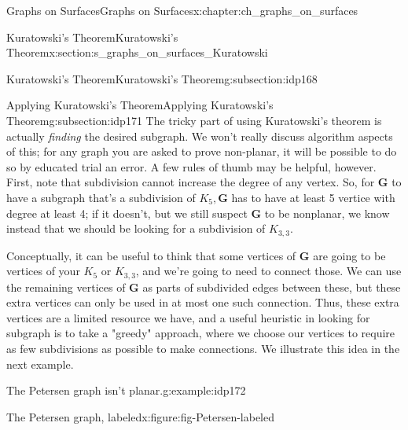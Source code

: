 \documentclass[oneside,10pt,]{book}
\numberwithin{equation}{section}
\newcommand{\bfG}{\mathbf{G}}
\begin{document}
\begin{chapterptx}{Graphs on Surfaces}{}{Graphs on Surfaces}{}{}{x:chapter:ch_graphs_on_surfaces}
\begin{sectionptx}{Kuratowski's Theorem}{}{Kuratowski's Theorem}{}{}{x:section:s_graphs_on_surfaces_Kuratowski}
\begin{subsectionptx}{Kuratowski's Theorem}{}{Kuratowski's Theorem}{}{}{g:subsection:idp168}
\end{subsectionptx}
%
%
\typeout{************************************************}
\typeout{************************************************}
%
\begin{subsectionptx}{Applying Kuratowski's Theorem}{}{Applying Kuratowski's Theorem}{}{}{g:subsection:idp171}
The tricky part of using Kuratowski's theorem is actually \emph{finding} the desired subgraph.  We won't really discuss algorithm aspects of this; for any graph you are asked to prove non-planar, it will be possible to do so by educated trial an error.  A few rules of thumb may be helpful, however.  First, note that subdivision cannot increase the degree of any vertex.  So, for \(\bfG\) to have a subgraph that's a subdivision of \(K_5, \bfG\) has to have at least 5 vertice with degree at least 4; if it doesn't, but we still suspect \(\bfG\) to be nonplanar, we know instead that we should be looking for a subdivision of \(K_{3,3}\).%
\par
Conceptually, it can be useful to think that some vertices of \(\bfG\) are going to be vertices of your \(K_5\) or \(K_{3,3}\), and we're going to need to connect those.  We can use the remaining vertices of \(\bfG\) as parts of subdivided edges between these, but these extra vertices can only be used in at most one such connection.  Thus, these extra vertices are a limited resource we have, and a useful heuristic in looking for subgraph is to take a "greedy" approach, where we choose our vertices to require as few subdivisions as possible to make connections.  We illustrate this idea in the next example.%
\begin{example}{The Petersen graph isn't planar.}{g:example:idp172}%
\begin{figureptx}{The Petersen graph, labeled}{x:figure:fig-Petersen-labeled}{}%
\begin{image}{0.05}{0.9}{0.05}%
\end{image}
\end{figureptx}
\end{example}
\end{subsectionptx}
\end{sectionptx}
\end{chapterptx}
\end{document}
